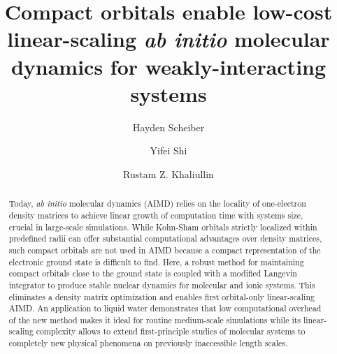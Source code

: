 \documentclass[aip,jcp,reprint,amsmath,amssymb]{revtex4-1}
\begin{document}
\title{
Compact orbitals enable low-cost linear-scaling \emph{ab initio} molecular dynamics for weakly-interacting systems
}

\author{Hayden Scheiber}
\author{Yifei Shi}
\author{Rustam Z. Khaliullin}



\begin{abstract}
Today, \emph{ab initio} molecular dynamics (AIMD) relies on the locality of one-electron density matrices to achieve linear growth of computation time with systems size, crucial in large-scale simulations. While Kohn-Sham orbitals strictly localized within predefined radii can offer substantial computational advantages over density matrices, such compact orbitals are not used in AIMD because a compact representation of the electronic ground state is difficult to find. Here, a robust method for maintaining compact orbitals close to the ground state is coupled with a modified Langevin integrator to produce stable nuclear dynamics for molecular and ionic systems. This eliminates a density matrix optimization and enables first orbital-only linear-scaling AIMD. An application to liquid water demonstrates that low computational overhead of the new method makes it ideal for routine medium-scale simulations while its linear-scaling complexity allows to extend first-principle studies of molecular systems to completely new physical phenomena on previously inaccessible length scales.
\end{abstract}
\end{document}
